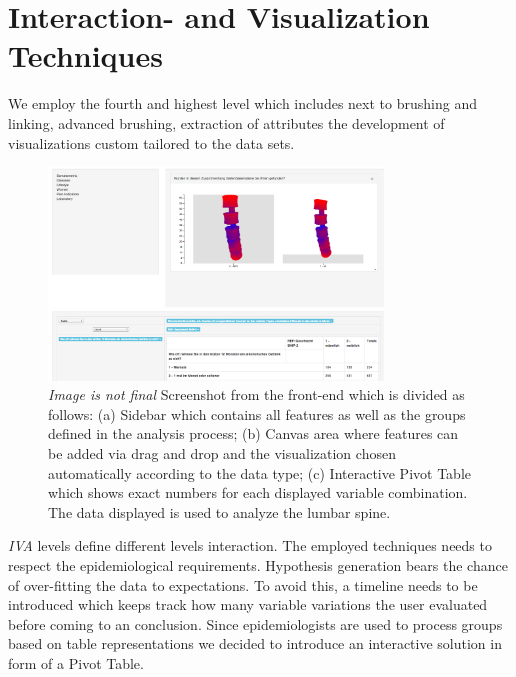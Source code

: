 \documentclass[journal]{style/vgtc} 			          %
\begin{document}
\section{Interaction- and Visualization Techniques} \label{Interaction- and Visualization Techniques}
We employ the fourth and highest level which includes next to brushing and linking, advanced brushing, extraction of attributes the development of visualizations custom tailored to the data sets.
\begin{figure}[htb]
 \centering
 \includegraphics[width=3.5in]{figures/visualization}
 \caption{\emph{Image is not final} Screenshot from the front-end which is divided as follows: (a) Sidebar which contains all features as well as the groups defined in the analysis process; (b) Canvas area where features can be added via drag and drop and the visualization chosen automatically according to the data type; (c) Interactive Pivot Table which shows exact numbers for each displayed variable combination. The data displayed is used to analyze the lumbar spine.
 }
 \label{fig:visualization}
\end{figure}
\emph{IVA} levels define different levels interaction. 
%
The employed techniques needs to respect the epidemiological requirements.
%
Hypothesis generation bears the chance of over-fitting the data to expectations.
%
To avoid this, a timeline needs to be introduced which keeps track how many variable variations the user evaluated before coming to an conclusion.
%
Since epidemiologists are used to process groups based on table representations we decided to introduce an interactive solution in form of a Pivot Table.
\end{document}
